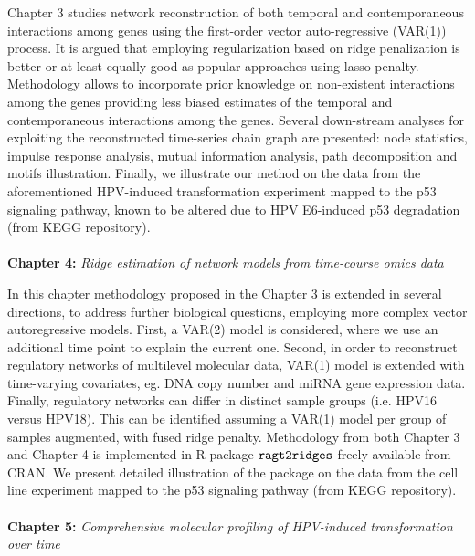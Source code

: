 Chapter 3 studies network reconstruction of both temporal and contemporaneous interactions among genes using the first-order vector auto-regressive (VAR(1)) process. It is argued that employing regularization based on ridge penalization is better or at least equally good as popular approaches \cite{Abegaz2013} using lasso penalty. Methodology allows to incorporate prior knowledge on non-existent interactions among the genes providing less biased estimates of the temporal and contemporaneous interactions among the genes. Several down-stream analyses for exploiting the reconstructed time-series chain graph are presented: node statistics, impulse response analysis, mutual information analysis, path decomposition and motifs illustration. Finally, we illustrate our method on the data from the aforementioned HPV-induced transformation experiment mapped to the p53 signaling pathway, known to be altered due to HPV E6-induced p53 degradation (from KEGG repository). 
\\
\\
\textbf{Chapter 4:} \textit{Ridge estimation of network models from time-course omics data}

In this chapter methodology proposed in the Chapter 3 is extended in several directions, to address further biological questions, employing more complex vector autoregressive models. First, a VAR(2) model is considered, where we use an additional time point to explain the current one. Second, in order to reconstruct regulatory networks of multilevel molecular data, VAR(1) model is extended with time-varying covariates, eg. DNA copy number and miRNA gene expression data. Finally, regulatory networks can differ in distinct sample groups (i.e. HPV16 versus HPV18). This can be identified assuming a VAR(1) model per group of samples augmented, with fused ridge penalty. Methodology from both Chapter 3 and Chapter 4 is implemented in R-package ${\tt ragt2ridges}$ freely available from CRAN. We present detailed illustration of the package on the data from the cell line experiment mapped to the p53 signaling pathway (from KEGG repository).
\\
\\
\textbf{Chapter 5:} \textit{Comprehensive molecular profiling of HPV-induced transformation over time}

